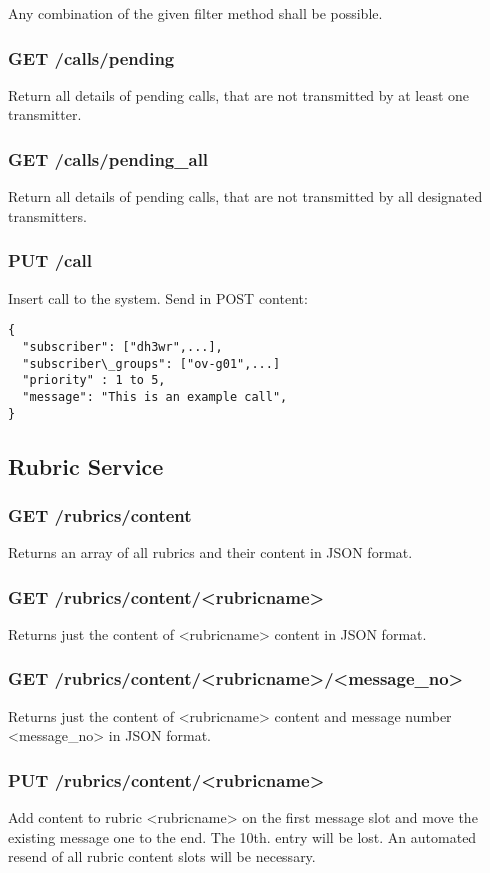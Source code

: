 Any combination of the given filter method shall be possible.

\subsubsection{GET /calls/pending}
Return all details of pending calls, that are not transmitted by at least one transmitter.

\subsubsection{GET /calls/pending\_all}
Return all details of pending calls, that are not transmitted by all designated transmitters.

\subsubsection{PUT /call}
Insert call to the system. Send in POST content:
\begin{lstlisting}
{
  "subscriber": ["dh3wr",...],
  "subscriber\_groups": ["ov-g01",...]
  "priority" : 1 to 5,
  "message": "This is an example call",
}
\end{lstlisting}

\subsection{Rubric Service}

\subsubsection{GET /rubrics/content}
Returns an array of all rubrics and their content in JSON format.

\subsubsection{GET /rubrics/content/<rubricname>}
Returns just the content of <rubricname> content in JSON format.

\subsubsection{GET /rubrics/content/<rubricname>/<message\_no>}
Returns just the content of <rubricname> content and message number <message\_no> in JSON format.

\subsubsection{PUT /rubrics/content/<rubricname>}
Add content to rubric <rubricname> on the first message slot and move the existing message one to the end. The 10th. entry will be lost. An automated resend of all rubric content slots will be necessary.

